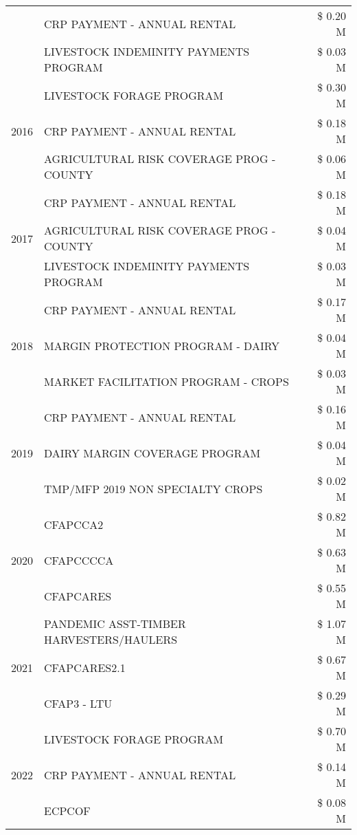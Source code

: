 \begin{tabular}{llr}
 & CRP PAYMENT - ANNUAL RENTAL & \$ 0.20 M \\
 & LIVESTOCK INDEMINITY PAYMENTS PROGRAM & \$ 0.03 M \\
\cline{1-3}
\multirow[t]{3}{*}{2016} & LIVESTOCK FORAGE PROGRAM & \$ 0.30 M \\
 & CRP PAYMENT - ANNUAL RENTAL & \$ 0.18 M \\
 & AGRICULTURAL RISK COVERAGE PROG - COUNTY & \$ 0.06 M \\
\cline{1-3}
\multirow[t]{3}{*}{2017} & CRP PAYMENT - ANNUAL RENTAL & \$ 0.18 M \\
 & AGRICULTURAL RISK COVERAGE PROG - COUNTY & \$ 0.04 M \\
 & LIVESTOCK INDEMINITY PAYMENTS PROGRAM & \$ 0.03 M \\
\cline{1-3}
\multirow[t]{3}{*}{2018} & CRP PAYMENT - ANNUAL RENTAL & \$ 0.17 M \\
 & MARGIN PROTECTION PROGRAM - DAIRY & \$ 0.04 M \\
 & MARKET FACILITATION PROGRAM - CROPS & \$ 0.03 M \\
\cline{1-3}
\multirow[t]{3}{*}{2019} & CRP PAYMENT - ANNUAL RENTAL & \$ 0.16 M \\
 & DAIRY MARGIN COVERAGE PROGRAM & \$ 0.04 M \\
 & TMP/MFP 2019 NON SPECIALTY CROPS & \$ 0.02 M \\
\cline{1-3}
\multirow[t]{3}{*}{2020} & CFAPCCA2 & \$ 0.82 M \\
 & CFAPCCCCA & \$ 0.63 M \\
 & CFAPCARES & \$ 0.55 M \\
\cline{1-3}
\multirow[t]{3}{*}{2021} & PANDEMIC ASST-TIMBER HARVESTERS/HAULERS & \$ 1.07 M \\
 & CFAPCARES2.1 & \$ 0.67 M \\
 & CFAP3 - LTU & \$ 0.29 M \\
\cline{1-3}
\multirow[t]{3}{*}{2022} & LIVESTOCK FORAGE PROGRAM & \$ 0.70 M \\
 & CRP PAYMENT - ANNUAL RENTAL & \$ 0.14 M \\
 & ECPCOF & \$ 0.08 M \\
\cline{1-3}
\bottomrule
\end{tabular}
